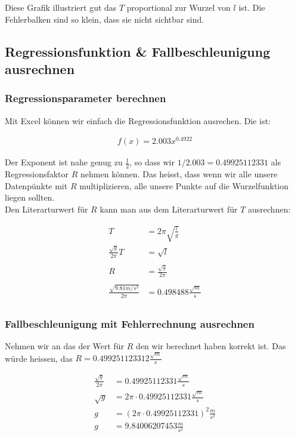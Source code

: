 \documentclass[12pt, a4paper, twoside]{article}
\begin{document}
Diese Grafik illustriert gut das $T$ proportional zur Wurzel von $l$ ist.
Die Fehlerbalken sind so klein, dass sie nicht sichtbar sind.

\subsection{Regressionsfunktion \& Fallbeschleunigung ausrechnen}
\subsubsection{Regressionsparameter berechnen}
Mit Excel können wir einfach die Regressionsfunktion ausrechen. Die ist:

\begin{align*}
  f(x) = 2.003x^{0.4922}
\end{align*}

Der Exponent ist nahe genug zu $\frac{1}{2}$, so dass wir $1/2.003 = 0.49925112331$ als Regressionsfaktor $R$ nehmen können.
Das heisst, dass wenn wir alle unsere Datenpünkte mit $R$ multiplizieren, alle unsere Punkte auf die Wurzelfunktion liegen sollten. \\
Den Literarturwert für $R$ kann man aus dem Literarturwert für $T$ ausrechnen:

\begin{align*}
  T                             & = 2\pi \sqrt{\frac{l}{g}}    \\
  \frac{\sqrt{g}}{2\pi}T        & = \sqrt{l}                   \\
  \\
  R                             & = \frac{\sqrt{g}}{2\pi}      \\
  \\
  \frac{\sqrt{9.81m/s^2}}{2\pi} & = 0.498488\frac{\sqrt{m}}{s} \\
\end{align*}

\subsubsection{Fallbeschleunigung mit Fehlerrechnung ausrechnen}
Nehmen wir an das der Wert für $R$ den wir berechnet haben korrekt ist.
Das würde heissen, das $R = 0.499251123312\frac{\sqrt{m}}{s}$

\begin{align*}
  \frac{\sqrt{g}}{2\pi} & = 0.49925112331\frac{\sqrt{m}}{s}           \\
  \sqrt{g}              & = 2\pi\cdot 0.49925112331\frac{\sqrt{m}}{s} \\
  g                     & = (2\pi\cdot 0.49925112331)^2\frac{m}{s^2}  \\
  g                     & = 9.84006207453\frac{m}{s^2}                \\
\end{align*}
\end{document}
